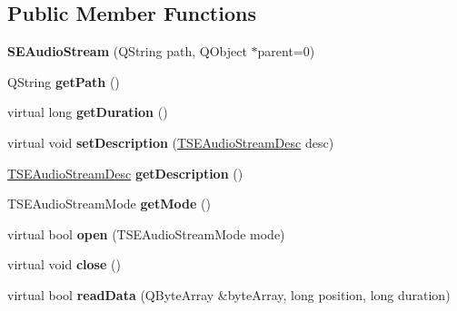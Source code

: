 \subsection*{Public Member Functions}
\begin{DoxyCompactItemize}
\item 
\hypertarget{class_s_e_audio_stream_ad4400267e4d64428f82f5b774e64d89d}{{\bfseries S\+E\+Audio\+Stream} (Q\+String path, Q\+Object $\ast$parent=0)}\label{class_s_e_audio_stream_ad4400267e4d64428f82f5b774e64d89d}

\item 
\hypertarget{class_s_e_audio_stream_acb2cd924f6e33ef742f30a750e0708f3}{Q\+String {\bfseries get\+Path} ()}\label{class_s_e_audio_stream_acb2cd924f6e33ef742f30a750e0708f3}

\item 
\hypertarget{class_s_e_audio_stream_a64f1a25545197281d9f556e9371511e2}{virtual long {\bfseries get\+Duration} ()}\label{class_s_e_audio_stream_a64f1a25545197281d9f556e9371511e2}

\item 
\hypertarget{class_s_e_audio_stream_a73cbe0d712b86dac39028cd0967474f3}{virtual void {\bfseries set\+Description} (\hyperlink{struct_t_s_e_audio_stream_desc}{T\+S\+E\+Audio\+Stream\+Desc} desc)}\label{class_s_e_audio_stream_a73cbe0d712b86dac39028cd0967474f3}

\item 
\hypertarget{class_s_e_audio_stream_af6cb98f0366c35353b6e6c7b2d0ffe24}{\hyperlink{struct_t_s_e_audio_stream_desc}{T\+S\+E\+Audio\+Stream\+Desc} {\bfseries get\+Description} ()}\label{class_s_e_audio_stream_af6cb98f0366c35353b6e6c7b2d0ffe24}

\item 
\hypertarget{class_s_e_audio_stream_ac1234e9c052d73def9f6a8b71516ec01}{T\+S\+E\+Audio\+Stream\+Mode {\bfseries get\+Mode} ()}\label{class_s_e_audio_stream_ac1234e9c052d73def9f6a8b71516ec01}

\item 
\hypertarget{class_s_e_audio_stream_a270d3f5b03562d1284fbe74060a6b32e}{virtual bool {\bfseries open} (T\+S\+E\+Audio\+Stream\+Mode mode)}\label{class_s_e_audio_stream_a270d3f5b03562d1284fbe74060a6b32e}

\item 
\hypertarget{class_s_e_audio_stream_a8c4af367964e8be4817df12989f06d40}{virtual void {\bfseries close} ()}\label{class_s_e_audio_stream_a8c4af367964e8be4817df12989f06d40}

\item 
\hypertarget{class_s_e_audio_stream_ab9c31f1004bbdf45ec8caee753ee127e}{virtual bool {\bfseries read\+Data} (Q\+Byte\+Array \&byte\+Array, long position, long duration)}\label{class_s_e_audio_stream_ab9c31f1004bbdf45ec8caee753ee127e}


\end{DoxyCompactItemize}
